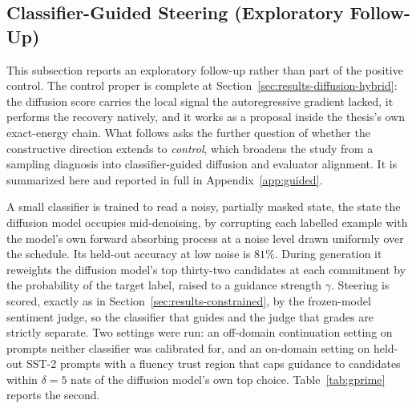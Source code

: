 \subsection{Classifier-Guided Steering (Exploratory Follow-Up)}
\label{sec:results-diffusion-guided}
\label{sec:results-diffusion-gprime} %

This subsection reports an exploratory follow-up rather than part of the positive control. The control proper is complete at Section~\ref{sec:results-diffusion-hybrid}: the diffusion score carries the local signal the autoregressive gradient lacked, it performs the recovery natively, and it works as a proposal inside the thesis's own exact-energy chain. What follows asks the further question of whether the constructive direction extends to \emph{control}, which broadens the study from a sampling diagnosis into classifier-guided diffusion and evaluator alignment. It is summarized here and reported in full in Appendix~\ref{app:guided}.

A small classifier is trained to read a noisy, partially masked state, the state the diffusion model occupies mid-denoising, by corrupting each labelled example with the model's own forward absorbing process at a noise level drawn uniformly over the schedule. Its held-out accuracy at low noise is $81\%$.
During generation it reweights the diffusion model's top thirty-two candidates at each commitment by the probability of the target label, raised to a guidance strength $\gamma$. Steering is scored, exactly as in Section~\ref{sec:results-constrained}, by the frozen-model sentiment judge, so the classifier that guides and the judge that grades are strictly separate. Two settings were run: an off-domain continuation setting on prompts neither classifier was calibrated for, and an on-domain setting on held-out SST-2 prompts with a fluency trust region that caps guidance to candidates within $\delta=5$ nats of the diffusion model's own top choice. Table~\ref{tab:gprime} reports the second.

